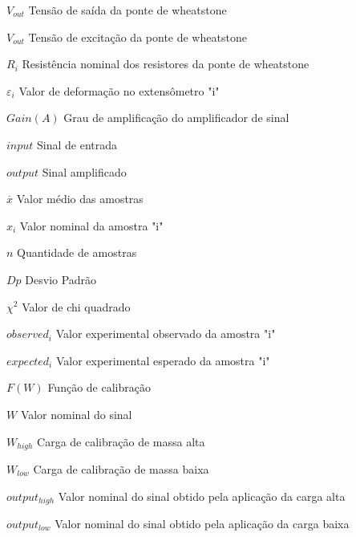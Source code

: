 \begin{simbolos}
    \item[$ V_{out} $] {Tensão de saída da ponte de wheatstone}
    \item[$ V_{out} $] {Tensão de excitação da ponte de wheatstone}
    \item[$ R_i $] {Resistência nominal dos resistores da ponte de wheatstone}

    \item[$ \varepsilon_{i} $] {Valor de deformação no extensômetro "i"}

    \item[$ Gain(A) $] {Grau de amplificação do amplificador de sinal}
    \item[$ input $] {Sinal de entrada}
    \item[$ output $] {Sinal amplificado}

    \item[$ \overline{x} $] {Valor médio das amostras}
    \item[$ x_i $] {Valor nominal da amostra "i"}
    \item[$ n $] {Quantidade de amostras}

    \item[$ Dp $] {Desvio Padrão}

    \item[$ \chi^{2} $] {Valor de chi quadrado}
    \item[$ observed_i $] {Valor experimental observado da amostra "i"}
    \item[$ expected_i $] {Valor experimental esperado da amostra "i"}

    \item[$ F(W) $] {Função de calibração}
    \item[$ W $] {Valor nominal do sinal}
    \item[$ W_{high} $] {Carga de calibração de massa alta}
    \item[$ W_{low} $] {Carga de calibração de massa baixa}
    \item[$ output_{high} $] {Valor nominal do sinal obtido pela aplicação da carga alta}
    \item[$ output_{low} $] {Valor nominal do sinal obtido pela aplicação da carga baixa}

\end{simbolos}
